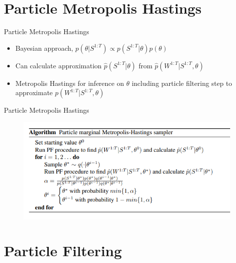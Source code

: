 \documentclass[aspectratio=169]{beamer}
\begin{document}
	\section{Particle Metropolis Hastings}
	
	\begin{frame}{Particle Metropolis Hastings}
	    \begin{itemize}
	        \item Bayesian approach, $p(\theta|S^{1:T}) \propto p(S^{1:T}|\theta)p(\theta) $
	        \item Can calculate approximation $\hat{p}(S^{1:T}|\theta)$ from $\hat{p}(W^{1:T}|S^{1:T}, \theta)$
	        \item Metropolis Hastings for inference on $\theta$ including particle filtering step to approximate $p(W^{1:T}|S^{1:T}, \theta)$
	    \end{itemize}
	\end{frame}
	
	\begin{frame}{Particle Metropolis Hastings}
	    \begin{figure}
	        \centering
	        \includegraphics[scale=0.8]{PMCMC3.png}
	    \end{figure}

	    
	\end{frame}
	
	\section{Particle Filtering}
	
\end{document}
